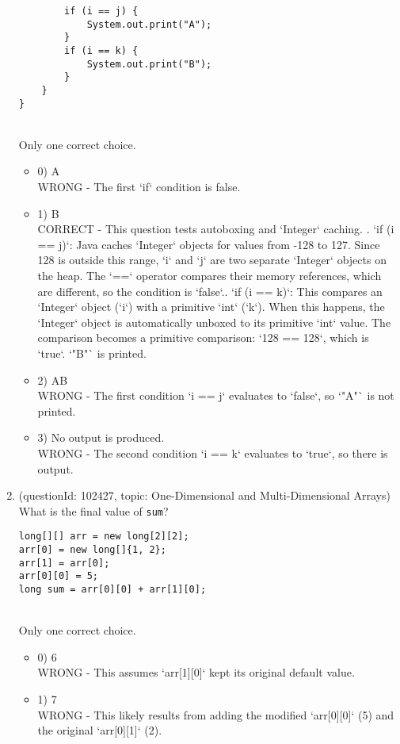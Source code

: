 \documentclass[12pt]{article}
\begin{document}
\begin{enumerate}[label=(\arabic*)]
\begin{verbatim}
        if (i == j) {
            System.out.print("A");
        }
        if (i == k) {
            System.out.print("B");
        }
    }
}
\end{verbatim}
\\ \noindent Only one correct choice. 
\begin{itemize}
\item 0) A
 \\ 
WRONG - The first `if` condition is false.

\item 1) B
 \\ 
CORRECT - This question tests autoboxing and `Integer` caching. . `if (i == j)`: Java caches `Integer` objects for values from -128 to 127. Since 128 is outside this range, `i` and `j` are two separate `Integer` objects on the heap. The `==` operator compares their memory references, which are different, so the condition is `false`.. `if (i == k)`: This compares an `Integer` object (`i`) with a primitive `int` (`k`). When this happens, the `Integer` object is automatically unboxed to its primitive `int` value. The comparison becomes a primitive comparison: `128 == 128`, which is `true`. `"B"` is printed.

\item 2) AB
 \\ 
WRONG - The first condition `i == j` evaluates to `false`, so `"A"` is not printed.

\item 3) No output is produced.
 \\ 
WRONG - The second condition `i == k` evaluates to `true`, so there is output.

\end{itemize}
\item (questionId: 102427, topic: One-Dimensional and Multi-Dimensional Arrays) \\ 
What is the final value of \verb|sum|?\begin{verbatim}
long[][] arr = new long[2][2];
arr[0] = new long[]{1, 2};
arr[1] = arr[0];
arr[0][0] = 5;
long sum = arr[0][0] + arr[1][0];
\end{verbatim}
\\ \noindent Only one correct choice. 
\begin{itemize}
\item 0) 6
 \\ 
WRONG - This assumes `arr[1][0]` kept its original default value.

\item 1) 7
 \\ 
WRONG - This likely results from adding the modified `arr[0][0]` (5) and the original `arr[0][1]` (2).


\end{itemize}
\end{enumerate}
\end{document}
